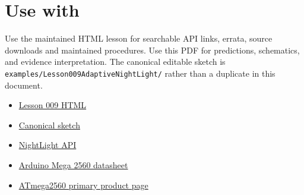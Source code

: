 \documentclass[11pt]{article}
\begin{document}
\section{Use with}

Use the maintained HTML lesson for searchable API links, errata, source
downloads and maintained procedures. Use this PDF for predictions, schematics,
and evidence interpretation. The canonical editable sketch
is \texttt{examples/Lesson009AdaptiveNightLight/} rather than a duplicate in
this document.

\begin{itemize}
  \item \href{https://spincyc.github.io/adk/lessons/009/}{Lesson 009 HTML}
  \item \href{https://github.com/spincyc/adk/tree/main/examples/Lesson009AdaptiveNightLight}{Canonical sketch}
  \item \href{https://github.com/spincyc/adk/blob/main/src/night_light.h}{NightLight API}
  \item \href{https://docs.arduino.cc/resources/datasheets/A000067-datasheet.pdf}{Arduino Mega 2560 datasheet}
  \item \href{https://www.microchip.com/en-us/product/ATmega2560}{ATmega2560 primary product page}
\end{itemize}
\end{document}

